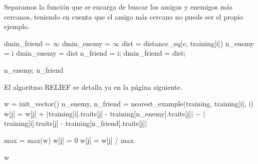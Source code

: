 \documentclass[12pt]{article}
\begin{document}
Separamos la función que se encarga de buscar los amigos y enemigos más cercanos, teniendo en cuenta que el amigo más cercano no puede ser el propio ejemplo.

\begin{algorithm}[h]
\begin{algorithmic}

     \State dmin\_friend = $\infty$
     \State dmin\_enemy = $\infty$
       
            \State dist = distance\_sq(e, training[i])
                  \State n\_enemy = i
                  \State dmin\_enemy = dist
                  \State n\_friend = i;
                  \State dmin\_friend = dist;

   \Return n\_enemy, n\_friend
\EndFunction

\end{algorithmic}
\end{algorithm}

El algoritmo RELIEF se detalla ya en la página siguiente.
\newpage

\begin{algorithm}[h!]
\begin{algorithmic}

     \State w = init\_vector()
       
         \State n\_enemy, n\_friend = nearest\_example(training, training[i], i)
           
            \State w[j] = w[j] + $|$training[i].traits[j] - training[n\_enemy].traits[j]$|$
            \State \hspace{2.5em} $-$ $|$training[i].traits[j] - training[n\_friend].traits[j]$|$
          
         \EndFor
      \EndFor
      \State max = max(w)
        
            \State w[j] = 0
        \Else
            \State w[j] = w[j] / max
        \EndIf
      
\hspace{-.7em} \Return w
\EndFunction

\end{algorithmic}
\end{algorithm}
\end{document}
